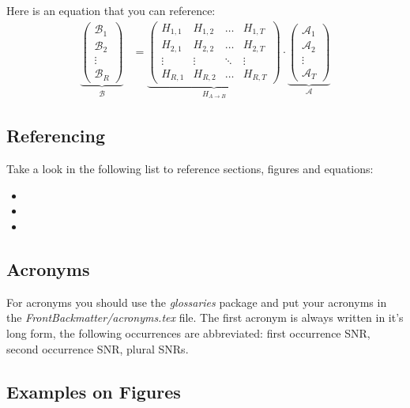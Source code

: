 Here is an equation that you can reference:
\begin{align}
\underbrace{\begin{pmatrix}\mathcal{B}_1\\\mathcal{B}_2\\\vdots\\\mathcal{B}_R\end{pmatrix}}_\mathcal{B} &= \underbrace{\begin{pmatrix}H_{1,1} & H_{1,2} & \hdots & H_{1,T}\\H_{2,1} & H_{2,2} & \hdots & H_{2,T}\\\vdots & \vdots & \ddots & \vdots\\H_{R,1} & H_{R,2} & \hdots & H_{R,T}\end{pmatrix}}_{H_{A\rightarrow B}}\cdot \underbrace{\begin{pmatrix}\mathcal{A}_1\\\mathcal{A}_2\\\vdots\\\mathcal{A}_T\end{pmatrix}}_\mathcal{A}\label{eqn:example}
\end{align}

\subsection{Referencing}

Take a look in the following list to reference sections, figures and equations:
\begin{itemize}
  \item {}
  \item {}
  \item {}
\end{itemize}

\subsection{Acronyms}
For acronyms you should use the \emph{glossaries} package and put your acronyms
in the \emph{FrontBackmatter/acronyms.tex} file. The first acronym is always
written in it's long form, the following occurrences are abbreviated: first
occurrence \gls{SNR}, second occurrence \gls{SNR}, plural \glspl{SNR}.

\subsection{Examples on Figures}


